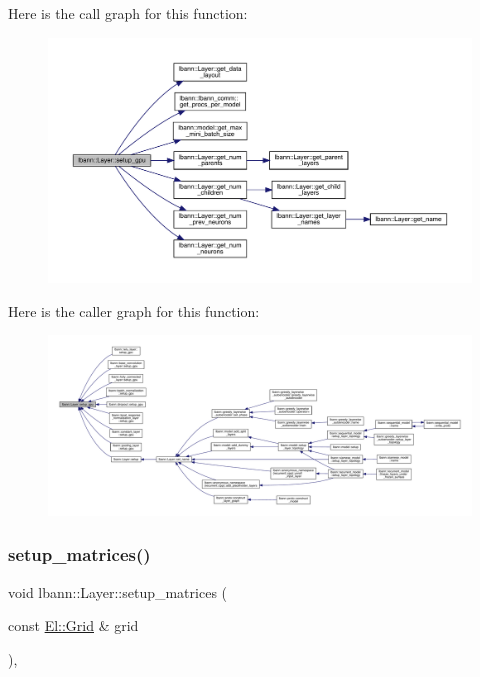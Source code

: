 Here is the call graph for this function\+:\nopagebreak
\begin{figure}[H]
\begin{center}
\leavevmode
\includegraphics[width=350pt]{classlbann_1_1Layer_a36aa22ef90ce4de65abe729d38490863_cgraph}
\end{center}
\end{figure}
Here is the caller graph for this function\+:\nopagebreak
\begin{figure}[H]
\begin{center}
\leavevmode
\includegraphics[width=350pt]{classlbann_1_1Layer_a36aa22ef90ce4de65abe729d38490863_icgraph}
\end{center}
\end{figure}
\mbox{\label{classlbann_1_1Layer_a57bbe21131dc00ab5cf9ea5e3656808e}} 
\subsubsection{\texorpdfstring{setup\+\_\+matrices()}{setup\_matrices()}}
{\footnotesize\ttfamily void lbann\+::\+Layer\+::setup\+\_\+matrices (\begin{DoxyParamCaption}\item[{const \hyperlink{base_8hpp_a9951bb1719d534e0401b1f06cad19eab}{El\+::\+Grid} \&}]{grid }\end{DoxyParamCaption})\hspace{0.3cm}{\ttfamily [protected]}, {\ttfamily [virtual]}}

